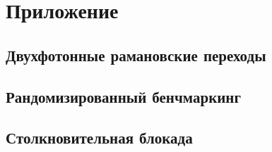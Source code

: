 \section{Приложение}

\subsection{Двухфотонные рамановские переходы}

\subsection{Рандомизированный бенчмаркинг}

\subsection{Столкновительная блокада}

\newpage